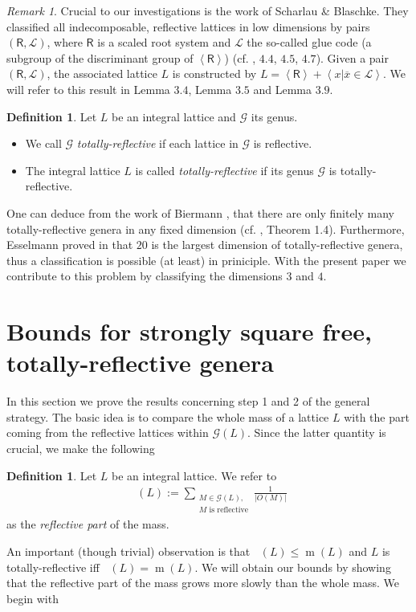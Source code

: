 \documentclass{amsart}
\theoremstyle{definition}
\newtheorem{defn}[thm]{Definition}
\theoremstyle{remark}
\newtheorem{rem}[thm]{Remark}
\def\|{\left | \right.}
\def\CG{{\mathcal G}}
\def\CG{{\mathcal G}}
\def\CL{{\mathcal L}}
\newcommand{\sR}{\mathsf R}
\DeclareMathOperator{\m}{m}
\DeclareMathOperator{\mref}{m_{ref}}
\begin{document}
\begin{rem}
Crucial to our investigations is the work of Scharlau \& Blaschke. 
They classified all indecomposable, reflective lattices in low dimensions by pairs $(\sR, \CL)$, 
where $\sR$ is a scaled root system and $\CL$ the so-called glue code (a subgroup of the discriminant group of $\left\langle \sR \right\rangle$) (cf. \cite{bs96}, $4.4$, $4.5$, $4.7$).
Given a pair $(\sR,\CL)$, the associated lattice $L$ is constructed by $L = \left\langle \sR \right\rangle + \left\langle x \| \overline{x} \in \CL \right\rangle$.
We will refer to this result in Lemma $3.4$, Lemma $3.5$ and Lemma $3.9$.
\end{rem}

\begin{defn}Let $L$ be an integral lattice and $\CG$ its genus.
 \begin{itemize}
  \item[a)] We call $\CG$ \emph{totally-reflective} if each lattice in $\CG$ is reflective.
  \item[b)] The integral lattice $L$ is called \emph{totally-reflective} if its genus $\CG$ is totally-reflective.
 \end{itemize}
\end{defn}
One can deduce from the work of Biermann \cite{bie81}, that there are only finitely many totally-reflective genera in any fixed dimension (cf. \cite{sw92}, Theorem 1.4). 
Furthermore, Esselmann proved in \cite{ess96} that $20$ is the largest dimension of totally-reflective genera, thus a classification is possible (at least) in priniciple.
With the present paper we contribute to this problem by classifying the dimensions $3$ and $4$.
\section{Bounds for strongly square free, totally-reflective genera}
In this section we prove the results concerning step 1 and 2 of the general strategy. 
The basic idea is to compare the whole mass of a lattice $L$ with the part coming from the reflective lattices within $\CG(L)$. 
Since the latter quantity is crucial, we make the following
\begin{defn}
 Let $L$ be an integral lattice. We refer to
 \begin{align*}
  \mref(L) := \sum_{\substack{M \in \CG(L),\\\text{$M$ is reflective}}} \frac{1}{|O(M)|}
 \end{align*}
 as the \emph{reflective part} of the mass.
\end{defn}
An important (though trivial) observation is that $\mref(L) \leq \m(L)$ and $L$ is totally-reflective iff $\mref(L) = \m(L)$.
We will obtain our bounds by showing that the reflective part of the mass grows more slowly than the whole mass.
We begin with
\end{document}
